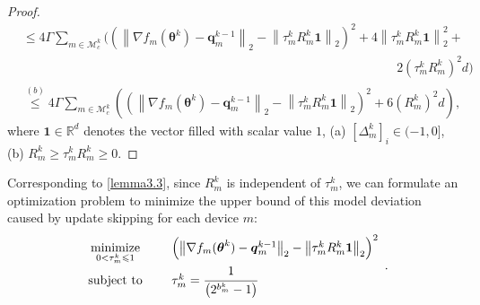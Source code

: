 \documentclass[lettersize,journal]{IEEEtran}
\begin{document}
\begin{proof}
\begin{equation}
\begin{aligned}
& \leqslant 4\Gamma \sum_{m \in \mathcal{M}_c^{k}} \bigg(\left(\left\|\nabla f_m(\boldsymbol{\theta}^k)-\boldsymbol{q}_{m}^{k-1}\right\|_2-\left\|\tau_m^k R_m^k \boldsymbol{1}\right\|_2\right)^2+4\left\|\tau_m^k R_m^k \boldsymbol{1}\right\|_2^2 + \\ 
&\phantom{ = 2\Gamma \sum_{m \in \mathcal{M}_c^{k}} \bigg((\left\|\nabla f_m(\boldsymbol{\theta}^k)-\boldsymbol{q}_{m}^{k-1}\right\|_2-\left\|\tau_m^k R_m^k \boldsymbol{1}\right\|_2}  \qquad \qquad \quad 2 (\tau_m^k R_m^k)^2 d\bigg)\\
& \overset{(b)}{\leqslant} 4\Gamma \sum_{m \in \mathcal{M}_c^{k}} \left(\left(\left\|\nabla f_m(\boldsymbol{\theta}^k)-\boldsymbol{q}_{m}^{k-1}\right\|_2-\left\|\tau_m^k R_m^k \boldsymbol{1}\right\|_2\right)^2+6 (R_m^k)^2 d\right),
\label{model_deviation}
\end{aligned}
\end{equation}
where $\boldsymbol{1} \in \mathbb{R}^d$ denotes the vector filled with scalar value $1$, (a) $[\Delta_m^k]_i \in (-1, 0]$, (b) $R_m^k \geqslant \tau_m^k R_m^k \geqslant 0$.
\end{proof}
Corresponding to \cref{lemma3.3}, since $R_m^k$ is independent of $\tau_m^k$, we can formulate an optimization problem to minimize the upper bound of this model deviation caused by update skipping for each device $m$:
\begin{equation}
   \begin{array}{cl}
\underset{0<\tau_m^k \leqslant 1}{\text{minimize}} & \quad \left(\big\|\nabla f_m(\boldsymbol{\theta}^k)-\boldsymbol{q}_{m}^{k-1}\big\|_2-\left\|\tau_m^k R_m^k \boldsymbol{1}\right\|_2\right)^2 \\
\text { subject to } & \quad \tau_m^k=\cfrac{1}{\left(2^{b_m^k}-1\right)}
\label{optimization_fun}
\end{array}.
\end{equation}
\end{document}
